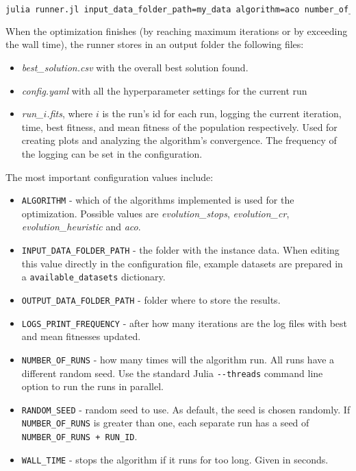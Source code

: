 \begin{lstlisting}[language=bash, breaklines=true]
    julia runner.jl input_data_folder_path=my_data algorithm=aco number_of_runs=10 num_ants=10 num_iterations=10000
\end{lstlisting}

When the optimization finishes (by reaching maximum iterations or by exceeding the wall time), the runner stores in an output folder the following files:

\begin{itemize}
    \setlength\itemsep{0pt}
    \item \textit{best\_solution.csv} with the overall best solution found.
    \item \textit{config.yaml} with all the hyperparameter settings for the current run
    \item \textit{run\_$i$.fits}, where $i$ is the run's id for each run, logging the current iteration, time, best fitness, and mean fitness of the population respectively. Used for creating plots and analyzing the algorithm's convergence. The frequency of the logging can be set in the configuration.
\end{itemize}

The most important configuration values include:

\begin{itemize}
    \setlength\itemsep{0pt}
    \item \texttt{ALGORITHM} - which of the algorithms implemented is used for the optimization. Possible values are \textit{evolution\_stops}, \textit{evolution\_cr}, \textit{evolution\_heuristic} and \textit{aco}.
    \item \texttt{INPUT\_DATA\_FOLDER\_PATH} - the folder with the instance data. When editing this value directly in the configuration file, example datasets are prepared in a \texttt{available\_datasets} dictionary.
    \item \texttt{OUTPUT\_DATA\_FOLDER\_PATH} - folder where to store the results.
    \item \texttt{LOGS\_PRINT\_FREQUENCY} - after how many iterations are the log files with best and mean fitnesses updated.
    \item \texttt{NUMBER\_OF\_RUNS} - how many times will the algorithm run. All runs have a different random seed. Use the standard Julia \texttt{-{}-threads} command line option to run the runs in parallel.
    \item \texttt{RANDOM\_SEED} - random seed to use. As default, the seed is chosen randomly. If \texttt{NUMBER\_OF\_RUNS} is greater than one, each separate run has a seed of \texttt{NUMBER\_OF\_RUNS + RUN\_ID}. 
    \item \texttt{WALL\_TIME} - stops the algorithm if it runs for too long. Given in seconds. 
\end{itemize}

